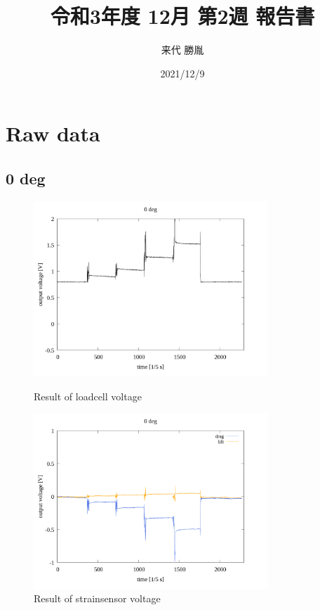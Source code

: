 \documentclass[twocolumn,a4j]{jsarticle}
\author{来代 勝胤}
\title{令和3年度 12月 第2週 報告書}
\date{2021/12/9}
\begin{document}
\columnseprule=0.1mm

\maketitle
\section{Raw data}
\subsection{0 deg}
\begin{figure}[htbp]
    \footnotesize
    \begin{center}
        \includegraphics[width=88mm]{../images/reverse/0_loadcell.png}
        \caption{Result of loadcell voltage}
        \includegraphics[width=88mm]{../images/reverse/0_strainsensor.png}
        \caption{Result of strainsensor voltage}
    \end{center}
\end{figure}

\newpage
\end{document}
